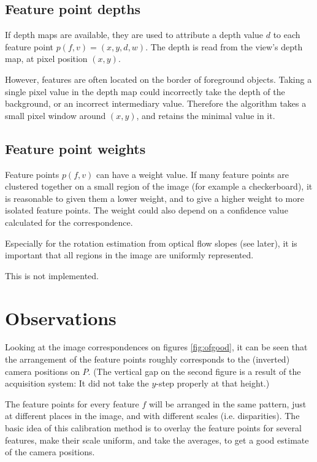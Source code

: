 \documentclass{scrreprt}
\begin{document}
\subsection{Feature point depths}
If depth maps are available, they are used to attribute a depth value $d$ to each feature point $p(f,v) = (x,y,d,w)$. The depth is read from the view's depth map, at pixel position $(x,y)$.

However, features are often located on the border of foreground objects. Taking a single pixel value in the depth map could incorrectly take the depth of the background, or an incorrect intermediary value. Therefore the algorithm takes a small pixel window around $(x,y)$, and retains the minimal value in it.



\subsection{Feature point weights}
Feature points $p(f,v)$ can have a weight value. If many feature points are clustered together on a small region of the image (for example a checkerboard), it is reasonable to given them a lower weight, and to give a higher weight to more isolated feature points. The weight could also depend on a confidence value calculated for the correspondence.

Especially for the rotation estimation from optical flow slopes (see later), it is important that all regions in the image are uniformly represented.

This is not implemented.

\pagebreak
\section{Observations}
Looking at the image correspondences on figures \ref{fig:ofgood}, it can be seen that the arrangement of the feature points roughly corresponds to the (inverted) camera positions on $P$. (The vertical gap on the second figure is a result of the acquisition system: It did not take the $y$-step properly at that height.) 

The feature points for every feature $f$ will be arranged in the same pattern, just at different places in the image, and with different scales (i.e. disparities). The basic idea of this calibration method is to overlay the feature points for several features, make their scale uniform, and take the averages, to get a good estimate of the camera positions.
\end{document}
